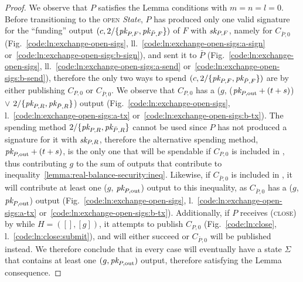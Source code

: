 \begin{proof}
  We observe that $P$ satisfies the Lemma conditions with $m = n = l = 0$.
  Before transitioning to the \textsc{open} \textit{State}, $P$ has produced
  only one valid signature for the ``funding'' output $(c, 2/\{\textit{pk}_{P, F},
  \textit{pk}_{\bar{P}, F}\})$ of $F$ with $\textit{sk}_{P, F}$, namely for $C_{\bar{P}, 0}$
  (Fig.~\ref{code:ln:exchange-open-sigs},
  ll.~\ref{code:ln:exchange-open-sigs:a-sign}
  or~\ref{code:ln:exchange-open-sigs:b-sign}), and sent it to $\bar{P}$
  (Fig.~\ref{code:ln:exchange-open-sigs},
  ll.~\ref{code:ln:exchange-open-sigs:a-send}
  or~\ref{code:ln:exchange-open-sigs:b-send}), therefore the only two ways to
  spend $(c, 2/\{\textit{pk}_{P, F}, \textit{pk}_{\bar{P}, F}\})$ are by either publishing $C_{P,
  0}$ or $C_{\bar{P}, 0}$. We observe that $C_{P, 0}$ has a ($g$, ($\textit{pk}_{P,
  \mathrm{out}} + (t + s)$) $\vee$ $2/\{\textit{pk}_{P, R}, \textit{pk}_{\bar{P}, R}\}$) output
  (Fig.~\ref{code:ln:exchange-open-sigs},
  l.~\ref{code:ln:exchange-open-sigs:a-tx}
  or~\ref{code:ln:exchange-open-sigs:b-tx}). The spending method $2/\{\textit{pk}_{P, R},
  \textit{pk}_{\bar{P}, R}\}$ cannot be used since $P$ has not produced a signature for
  it with $\textit{sk}_{P, R}$, therefore the alternative spending method, $\textit{pk}_{P,
  \mathrm{out}} + (t + s)$, is the only one that will be spendable if $C_{P, 0}$
  is included in \ledger, thus contributing $g$ to the sum of outputs that
  contribute to inequality~\ref{lemma:real-balance-security:ineq}. Likewise, if
  $C_{\bar{P}, 0}$ is included in \ledger, it will contribute at least one ($g$,
  $\textit{pk}_{P, \mathrm{out}}$) output to this inequality, as $C_{\bar{P}, 0}$ has a
  ($g$, $\textit{pk}_{P, \mathrm{out}}$) output (Fig.~\ref{code:ln:exchange-open-sigs},
  l.~\ref{code:ln:exchange-open-sigs:a-tx}
  or~\ref{code:ln:exchange-open-sigs:b-tx}). Additionally, if $P$ receives
  (\textsc{close}) by \environment while $H = ([], [g])$, it attempts to publish
  $C_{P, 0}$ (Fig.~\ref{code:ln:close}, l.~\ref{code:ln:close:submit}), and will
  either succeed or $C_{\bar{P}, 0}$ will be published instead. We therefore
  conclude that in every case \ledger will eventually have a state $\Sigma$ that
  contains at least one $(g, \textit{pk}_{P, \mathrm{out}})$ output, therefore satisfying
  the Lemma consequence.


\end{proof}
